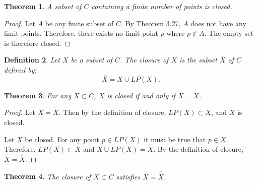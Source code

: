 \documentclass{amsart}
\newtheorem{theorem}{Theorem}
\newtheorem{definition}[theorem]{Definition}
\newcommand{\1}{\mathds{1}}
\numberwithin{equation}{section}
\numberwithin{theorem}{section}
\begin{document}
\begin{theorem}  A subset of $C$ containing a finite number of points is closed.
\end{theorem}

\begin{proof}
	Let $A$ be any finite subset of $C$. By Theorem 3.27, $A$ does not have any limit points. Therefore, there exists no limit point $p$ where $p\notin A$. The empty set is therefore closed.
\end{proof}

\begin{definition}
Let $X$ be a subset of $C$.  The \emph{closure} of $X$ is the subset $\overline{X}$ of $C$ defined by:
\[
\overline{X} = X \cup LP(X).
\]
\end{definition}

\begin{theorem}  For any $X\subset C$, $X$ is closed if and only if $X = \overline{X}$.
\end{theorem}

\begin{proof}
	Let $X = \overline{X}$. Then by the definition of closure, $LP(X)\subset X$, and $X$ is closed.
	
	Let $X$ be closed. For any point $p\in LP(X)$ it must be true that $p\in X$. Therefore, $LP(X)\subset X$ and $X\cup LP(X) = X$. By the definition of closure, $X = \overline{X}$.
\end{proof}

\begin{theorem}  The closure of $X \subset C$ satisfies $\overline{X} = \overline{\overline{X}}$.
\end{theorem}
\end{document}
